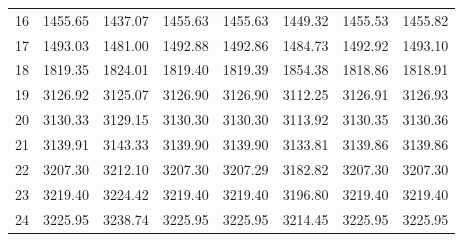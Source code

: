 \documentclass[10pt,oneside]{article}
\begin{document}
\begin{table}[h!]
\begin{tabular}{cccccccc}
16 &   1455.65 & 1437.07 & 1455.63 & 1455.63 &      1449.32 & 1455.53 & 1455.82 \\
17 &   1493.03 & 1481.00 & 1492.88 & 1492.86 &      1484.73 & 1492.92 & 1493.10 \\
18 &   1819.35 & 1824.01 & 1819.40 & 1819.39 &      1854.38 & 1818.86 & 1818.91 \\
19 &   3126.92 & 3125.07 & 3126.90 & 3126.90 &      3112.25 & 3126.91 & 3126.93 \\
20 &   3130.33 & 3129.15 & 3130.30 & 3130.30 &      3113.92 & 3130.35 & 3130.36 \\
21 &   3139.91 & 3143.33 & 3139.90 & 3139.90 &      3133.81 & 3139.86 & 3139.86 \\
22 &   3207.30 & 3212.10 & 3207.30 & 3207.29 &      3182.82 & 3207.30 & 3207.30 \\
23 &   3219.40 & 3224.42 & 3219.40 & 3219.40 &      3196.80 & 3219.40 & 3219.40 \\
24 &   3225.95 & 3238.74 & 3225.95 & 3225.95 &      3214.45 & 3225.95 & 3225.95 \\
\bottomrule
\end{tabular}
\end{table}

\clearpage
\end{document}
